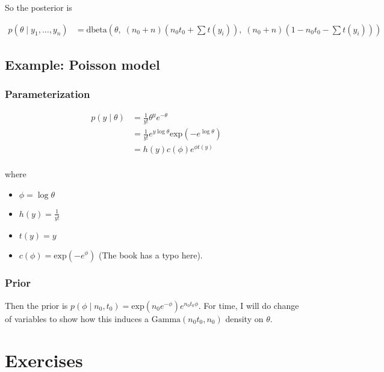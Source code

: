 \documentclass[]{article}
\providecommand{\tightlist}{%
  \setlength{\itemsep}{0pt}\setlength{\parskip}{0pt}}
\begin{document}
So the posterior is

\begin{align}
p(\theta \mid y_1, \dots, y_n) &= \text{dbeta}\left(\theta,\; (n_0 + n)\left(n_0 t_0 + \sum t(y_i) \right),\; (n_0 + n) \left(1 - n_0 t_0 - \sum t(y_i) \right) \right)
\end{align}

\hypertarget{example-poisson-model}{%
\subsection{Example: Poisson model}\label{example-poisson-model}}

\hypertarget{parameterization-1}{%
\subsubsection{Parameterization}\label{parameterization-1}}

\begin{align}
p(y \mid \theta) &= \frac{1}{y!} \theta^{y} e^{-\theta} \\
&= \frac{1}{y!} e^{y \log \theta} \text{exp}(-e^{\log \theta}) \\
&= h(y) c(\phi) e^{\phi t(y)} \\
\end{align}

where

\begin{itemize}
\tightlist
\item
  \(\phi = \log \theta\)
\item
  \(h(y) = \frac{1}{y!}\)
\item
  \(t(y) = y\)
\item
  \(c(\phi) = \text{exp}(-e^\phi)\) (The book has a typo here).
\end{itemize}

\hypertarget{prior-1}{%
\subsubsection{Prior}\label{prior-1}}

Then the prior is
\(p(\phi \mid n_0, t_0) = \text{exp}(n_0 e^{-\phi}) e^{n_0 t_0 \phi}\).
For time, I will do change of variables to show how this induces a
\(\text{Gamma}(n_0 t_0, n_0)\) density on \(\theta\).

\hypertarget{exercises}{%
\section{Exercises}\label{exercises}}
\end{document}
